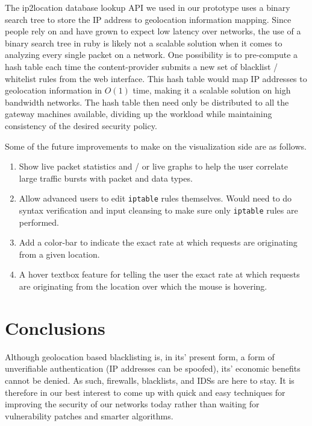 \documentclass[aps,preprint,amsmath,amssymb]{revtex4}
\begin{document}
The ip2location database lookup API we used in our prototype uses a binary search tree
to store the IP address to geolocation information mapping. Since people rely on and
have grown to expect low latency over networks, the use of a binary search tree in ruby
is likely not a scalable solution when it comes to analyzing every single packet on a
network. One possibility is to pre-compute a hash table each time the content-provider
submits a new set of blacklist / whitelist rules from the web interface. This hash table
would map IP addresses to geolocation information in $O(1)$ time, making it a scalable
solution on high bandwidth networks. The hash table then need only be distributed to all the
gateway machines available, dividing up the workload while maintaining consistency of
the desired security policy.

Some of the future improvements to make on the visualization side are as follows.

\begin{enumerate}
\item Show live packet statistics and / or live graphs to help the user
correlate large traffic bursts with packet and data types.
\item Allow advanced users to edit \verb+iptable+ rules themselves. Would need to
do syntax verification and input cleansing to make sure only \verb+iptable+ rules
are performed.
\item Add a color-bar to indicate the exact rate at which requests are originating
from a given location.
\item A hover textbox feature for telling the user the exact rate at which requests
are originating from the location over which the mouse is hovering.
\end{enumerate}

\section{Conclusions}
Although geolocation based blacklisting is, in its' present form, a form of unverifiable
authentication (IP addresses can be spoofed), its' economic benefits cannot be denied.
As such, firewalls, blacklists, and IDSs are here to stay. It is therefore in our best
interest to come up with quick and easy techniques for improving the security of our
networks today rather than waiting for vulnerability patches and smarter algorithms.


%

\end{document}
